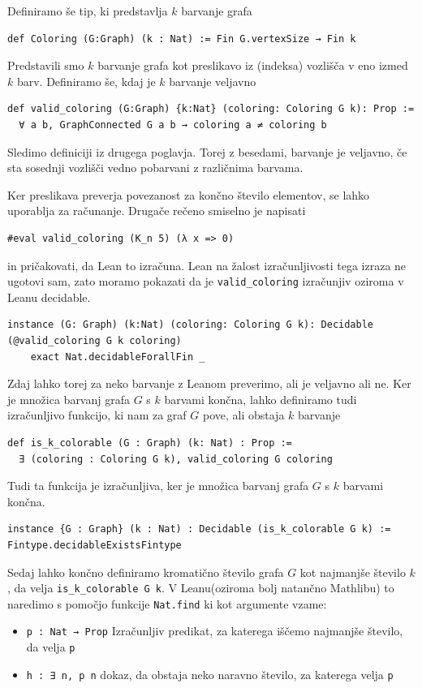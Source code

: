 \documentclass[mat1]{fmfdelo}
\begin{document}
Definiramo še tip, ki predstavlja $k$ barvanje grafa
\begin{lstlisting}
def Coloring (G:Graph) (k : Nat) := Fin G.vertexSize → Fin k
\end{lstlisting}

Predstavili smo $k$ barvanje grafa kot preslikavo iz (indeksa) vozlišča v eno izmed $k$ barv.
Definiramo še, kdaj je $k$ barvanje veljavno
\begin{lstlisting}
def valid_coloring (G:Graph) {k:Nat} (coloring: Coloring G k): Prop :=
  ∀ a b, GraphConnected G a b → coloring a ≠ coloring b
\end{lstlisting}
Sledimo definiciji iz drugega poglavja. Torej z besedami, barvanje je veljavno, 
če sta sosednji vozlišči vedno pobarvani z različnima barvama.

Ker preslikava preverja povezanost za končno število elementov, se lahko uporablja za računanje. Drugače rečeno smiselno
je napisati
\begin{lstlisting}
#eval valid_coloring (K_n 5) (λ x => 0)
\end{lstlisting}
in pričakovati, da Lean to izračuna. Lean na žalost izračunljivosti tega izraza ne ugotovi sam, zato moramo pokazati
da je \lstinline{valid_coloring} izračunjiv oziroma v Leanu decidable.
\begin{lstlisting}
instance (G: Graph) (k:Nat) (coloring: Coloring G k): Decidable (@valid_coloring G k coloring)
    exact Nat.decidableForallFin _
\end{lstlisting}

Zdaj lahko torej za neko barvanje z Leanom preverimo, ali je veljavno ali ne. 
Ker je množica barvanj grafa $G$ s $k$ barvami končna, lahko definiramo tudi izračunljivo funkcijo, ki nam 
za graf $G$ pove, ali obstaja $k$ barvanje
\begin{lstlisting}
def is_k_colorable (G : Graph) (k: Nat) : Prop :=
  ∃ (coloring : Coloring G k), valid_coloring G coloring
\end{lstlisting}

Tudi ta funkcija je izračunljiva, ker je množica barvanj grafa $G$ s $k$ barvami končna.
\begin{lstlisting}
instance {G : Graph} (k : Nat) : Decidable (is_k_colorable G k) := Fintype.decidableExistsFintype
\end{lstlisting}

Sedaj lahko končno definiramo kromatično število grafa $G$ kot najmanjše število $k$, da velja
\lstinline{is_k_colorable G k}. V Leanu(oziroma bolj natančno Mathlibu) to naredimo s pomočjo funkcije \lstinline{Nat.find}
ki kot argumente vzame:
\begin{itemize}
    \item \lstinline{p : Nat → Prop} Izračunljiv predikat, za katerega iščemo najmanjše število, da velja \lstinline{p}
    \item \lstinline{h : ∃ n, p n} dokaz, da obstaja neko naravno število, za katerega velja \lstinline{p}
\end{itemize}
\end{document}
